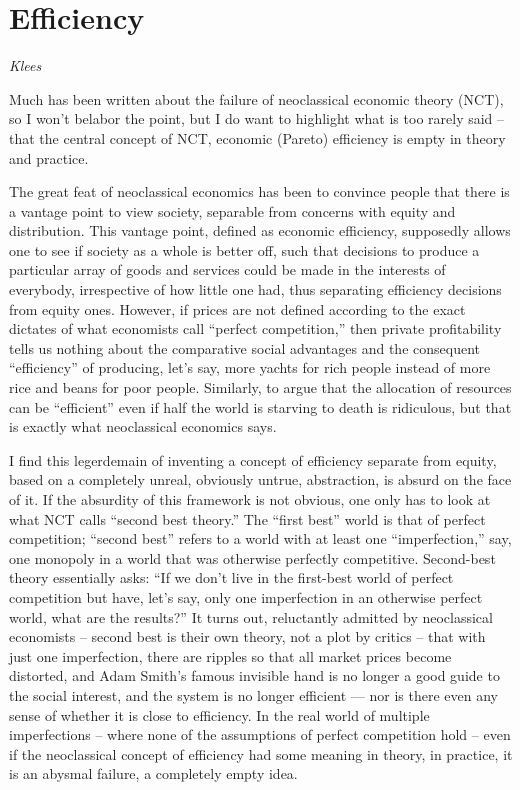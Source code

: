 \documentclass[
]{book}
\begin{document}
\hypertarget{efficiency}{%
\section{Efficiency}\label{efficiency}}

\emph{Klees}

Much has been written about the failure of neoclassical economic theory (NCT), so I won't belabor the point, but I do want to highlight what is too rarely said -- that the central concept of NCT, economic (Pareto) efficiency is empty in theory and practice.

The great feat of neoclassical economics has been to convince people that there is a vantage point to view society, separable from concerns with equity and distribution. This vantage point, defined as economic efficiency, supposedly allows one to see if society as a whole is better off, such that decisions to produce a particular array of goods and services could be made in the interests of everybody, irrespective of how little one had, thus separating efficiency decisions from equity ones. However, if prices are not defined according to the exact dictates of what economists call ``perfect competition,'' then private profitability tells us nothing about the comparative social advantages and the consequent ``efficiency'' of producing, let's say, more yachts for rich people instead of more rice and beans for poor people. Similarly, to argue that the allocation of resources can be ``efficient'' even if half the world is starving to death is ridiculous, but that is exactly what neoclassical economics says.

I find this legerdemain of inventing a concept of efficiency separate from equity, based on a completely unreal, obviously untrue, abstraction, is absurd on the face of it. If the absurdity of this framework is not obvious, one only has to look at what NCT calls ``second best theory.'' The ``first best'' world is that of perfect competition; ``second best'' refers to a world with at least one ``imperfection,'' say, one monopoly in a world that was otherwise perfectly competitive. Second-best theory essentially asks: ``If we don't live in the first-best world of perfect competition but have, let's say, only one imperfection in an otherwise perfect world, what are the results?'' It turns out, reluctantly admitted by neoclassical economists -- second best is their own theory, not a plot by critics -- that with just one imperfection, there are ripples so that all market prices become distorted, and Adam Smith's famous invisible hand is no longer a good guide to the social interest, and the system is no longer efficient --- nor is there even any sense of whether it is close to efficiency. In the real world of multiple imperfections -- where none of the assumptions of perfect competition hold -- even if the neoclassical concept of efficiency had some meaning in theory, in practice, it is an abysmal failure, a completely empty idea.
\end{document}
